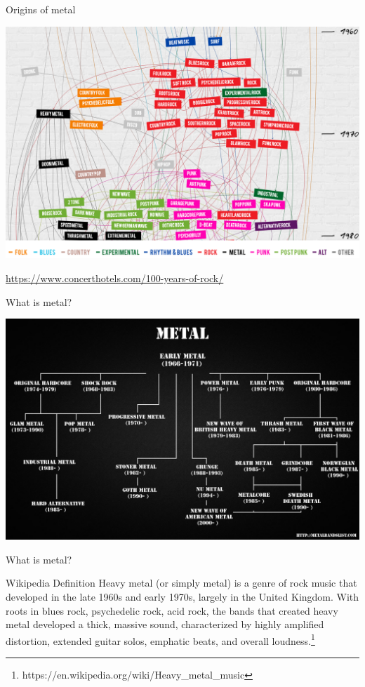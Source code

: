 \documentclass{beamer}
\begin{document}
    \begin{frame}{Origins of metal}
      \begin{center}
        \includegraphics[scale=.33]{familyTree2}
      \end{center}
      \href{https://www.concerthotels.com/100-years-of-rock/}{https://www.concerthotels.com/100-years-of-rock/}
    \end{frame}

    \begin{frame}{What is metal?}
      \pause
      \begin{center}
        \includegraphics[scale=.18]{familyTree}
      \end{center}
    \end{frame}

    \begin{frame}{What is metal?}

      \begin{block}{Wikipedia Definition}
        Heavy metal (or simply metal) is a genre of rock music that developed in the late 1960s
        and early 1970s, largely in the United Kingdom. With roots in blues rock, psychedelic
        rock, acid rock, the bands that created heavy metal developed a thick, massive sound,
        characterized by highly amplified distortion, extended guitar solos, emphatic beats,
        and overall loudness.\footnote{https://en.wikipedia.org/wiki/Heavy\_metal\_music}
      \end{block}

    \end{frame}
\end{document}
